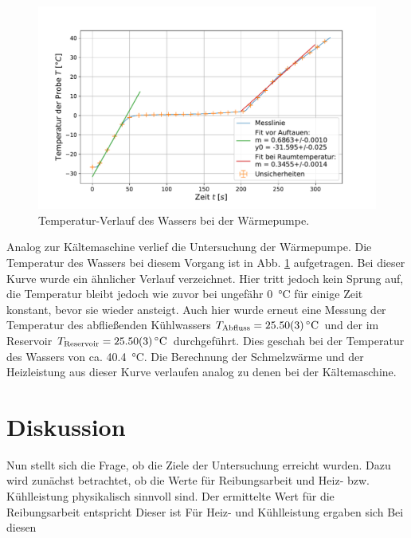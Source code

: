 	\begin{figure}[ht]
		\centering
		\includegraphics[width=\textwidth]{data/warm_machen.pdf}
		\caption{Temperatur-Verlauf des Wassers bei der Wärmepumpe.}
		\label{fig:Wärmepumpe}	
	\end{figure}
	Analog zur Kältemaschine verlief die Untersuchung der Wärmepumpe. 
	Die Temperatur des Wassers bei diesem Vorgang ist in Abb. \ref{fig:Wärmepumpe} aufgetragen.
	Bei dieser Kurve wurde ein ähnlicher Verlauf verzeichnet.
	Hier tritt jedoch kein Sprung auf, die Temperatur bleibt jedoch wie zuvor bei ungefähr \SI{0}{\celsius} für einige Zeit konstant, bevor sie wieder ansteigt.
	Auch hier wurde erneut eine Messung der Temperatur des abfließenden Kühlwassers $T_\text{Abfluss} = \SI{25,5+-0,03}{\celsius}$ und der im Reservoir $T_\text{Reservoir} = \SI{25,5+-0,03}{\celsius}$ durchgeführt.
	Dies geschah bei der Temperatur des Wassers von ca. \SI{40,4}{\celsius}.
	Die Berechnung der Schmelzwärme und der Heizleistung aus dieser Kurve verlaufen analog zu denen bei der Kältemaschine.
	
\section{Diskussion}
	
	Nun stellt sich die Frage, ob die Ziele der Untersuchung erreicht wurden.
	Dazu wird zunächst betrachtet, ob die Werte für Reibungsarbeit und Heiz- bzw. Kühlleistung physikalisch sinnvoll sind.
	Der ermittelte Wert für die Reibungsarbeit entspricht %
	Dieser ist %
	Für Heiz- und Kühlleistung ergaben sich %
	Bei diesen %
	
